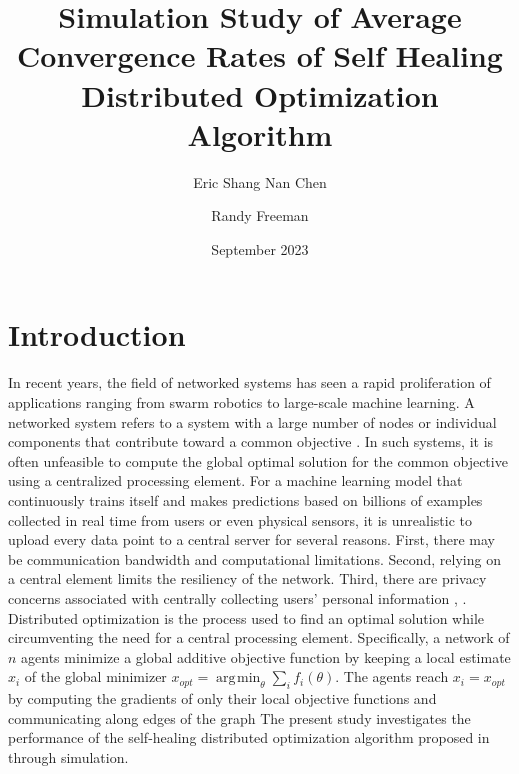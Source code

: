 \documentclass[conference]{IEEEtran}
\DeclareMathOperator*{\argmin}{\arg\!\min}
\begin{document}
\title{Simulation Study of Average Convergence Rates of Self Healing Distributed Optimization Algorithm}
\author{Eric Shang Nan Chen}
\author{Randy Freeman}
\date{September 2023}

\maketitle

\section{Introduction}
\label{sec:introduction}

In recent years, the field of networked systems has seen a rapid proliferation of
applications ranging from swarm robotics to large-scale machine learning. A networked system
refers to a system with a large number of nodes or individual components that contribute toward a
common objective \autocite{yangSurveyDistributedOptimization2019}. In such systems, it is often 
unfeasible to compute the global optimal solution for the common objective using a centralized processing element. 
For a machine learning
model that continuously trains itself and makes predictions based on billions of examples collected
in real time from users or even physical sensors, it is unrealistic to upload every data point to a
central server for several reasons. First, there may be communication bandwidth and
computational limitations. Second, relying on a central element limits the resiliency of the network.
Third, there are privacy concerns associated with centrally collecting users' personal information
\autocite{boydDistributedOptimizationStatistical2010}, \autocite{ridgleySelfHealingFirstOrderDistributed2021}. Distributed optimization is the process used to find an optimal solution while circumventing
the need for a central processing element. Specifically, a network of $n$ agents minimize a 
global additive objective function by keeping a local estimate $x_{i}$ of the global minimizer 
$x_{opt} = \argmin_{\theta} \sum_{i}f_{i}(\theta)$. The agents reach $x_{i} = x_{opt}$ by computing 
 the gradients of only their local objective functions and communicating along edges of the graph \autocite{ridgleySelfHealingFirstOrderDistributed2021} The present study investigates the performance of the self-healing distributed optimization algorithm 
proposed in \autocite{ridgleySelfHealingFirstOrderDistributed2021} through simulation.
\end{document}
